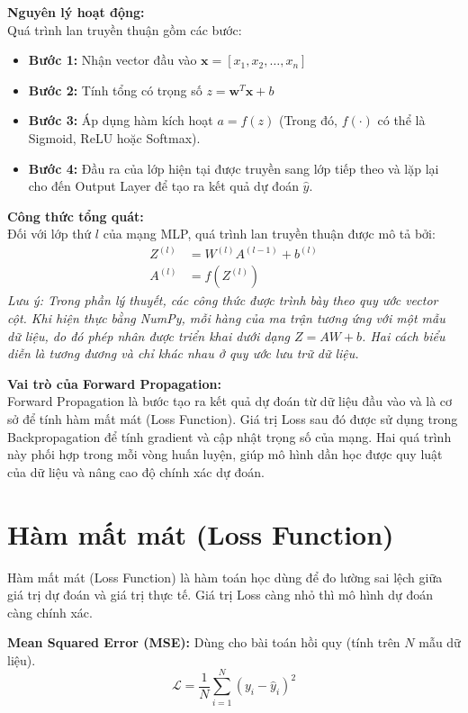 \documentclass[12pt,a4paper]{report}
\begin{document}
\textbf{Nguyên lý hoạt động:} \\
Quá trình lan truyền thuận gồm các bước:
\begin{itemize}
    \item \textbf{Bước 1:} Nhận vector đầu vào $\mathbf{x} = [x_1, x_2, \dots, x_n]$
    \item \textbf{Bước 2:} Tính tổng có trọng số $z = \mathbf{w}^T \mathbf{x} + b$
    \item \textbf{Bước 3:} Áp dụng hàm kích hoạt $a = f(z)$ (Trong đó, $f(\cdot)$ có thể là Sigmoid, ReLU hoặc Softmax).
    \item \textbf{Bước 4:} Đầu ra của lớp hiện tại được truyền sang lớp tiếp theo và lặp lại cho đến Output Layer để tạo ra kết quả dự đoán $\hat{y}$.
\end{itemize}

\textbf{Công thức tổng quát:} \\
Đối với lớp thứ $l$ của mạng MLP, quá trình lan truyền thuận được mô tả bởi:
\begin{align}
    Z^{(l)} &= W^{(l)} A^{(l-1)} + b^{(l)} \\
    A^{(l)} &= f\left(Z^{(l)}\right)
\end{align}
\textit{Lưu ý: Trong phần lý thuyết, các công thức được trình bày theo quy ước vector cột. Khi hiện thực bằng NumPy, mỗi hàng của ma trận tương ứng với một mẫu dữ liệu, do đó phép nhân được triển khai dưới dạng $Z = AW + b$. Hai cách biểu diễn là tương đương và chỉ khác nhau ở quy ước lưu trữ dữ liệu.}

\textbf{Vai trò của Forward Propagation:} \\
Forward Propagation là bước tạo ra kết quả dự đoán từ dữ liệu đầu vào và là cơ sở để tính hàm mất mát (Loss Function). Giá trị Loss sau đó được sử dụng trong Backpropagation để tính gradient và cập nhật trọng số của mạng. Hai quá trình này phối hợp trong mỗi vòng huấn luyện, giúp mô hình dần học được quy luật của dữ liệu và nâng cao độ chính xác dự đoán.

\section{Hàm mất mát (Loss Function)}
Hàm mất mát (Loss Function) là hàm toán học dùng để đo lường sai lệch giữa giá trị dự đoán và giá trị thực tế. Giá trị Loss càng nhỏ thì mô hình dự đoán càng chính xác. 

\textbf{Mean Squared Error (MSE):} Dùng cho bài toán hồi quy (tính trên $N$ mẫu dữ liệu).
\begin{equation}
    \mathcal{L} = \frac{1}{N} \sum_{i=1}^N (y_i - \hat{y}_i)^2
\end{equation}
\end{document}
